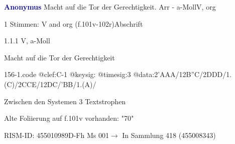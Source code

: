 \documentclass[twocolumn]{book}
\begin{document}
\par \vspace{7pt} \textcolor{darkblue}{\textbf{Anonymus  }}\hfillplus{\textbf{[156]}}\newline Macht auf die Tor der Gerechtigkeit. Arr - a-Moll\newline V, org
\par \begin{itshape}\end{itshape} 
\par \textcolor{darkblue}{}  1 Stimmen: V and org  (f.101v-102r)\newline Abschrift
\par 1.1.1  V, a-Moll\newline \begin{footnotesize} Macht auf die Tor der Gerechtigkeit \end{footnotesize}  
\begin{filecontents*}{156-1.code}
@clef:C-1
@keysig:
@timesig:3
@data:2'AAA/12B''C/2DDD/1.(C)/2CCE/12DC/'BB/1.(A)/
\end{filecontents*}
\newline
%
\par Zwischen den Systemen 3 Textstrophen
\par Alte Foliierung auf f.101v vorhanden: "70"
\par RISM-ID: 455010989\newline D-Fh  Ms 001\newline $\rightarrow$ In Sammlung 418 (455008343)
      
\end{document}
